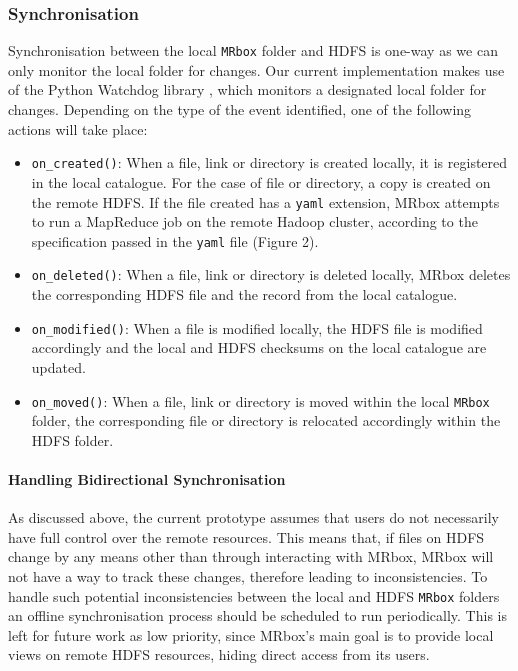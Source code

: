 \subsubsection{Synchronisation}
Synchronisation between the local \texttt{MRbox} folder and HDFS is one-way as we can only monitor the local folder for changes. Our current implementation makes use of the Python Watchdog library \cite{watchdog}, which monitors a designated local folder for changes. Depending on the type of the event identified, one of the following actions will take place: 
\begin{itemize}
    \item \texttt{on\_created()}: When a file, link or directory is created locally, it is registered in the local catalogue. For the case of file or directory, a copy is created on the remote HDFS. If the file created has a \texttt{yaml} extension, MRbox attempts to run a MapReduce job on the remote Hadoop cluster, according to the specification passed in the \texttt{yaml} file (Figure 2). 
    \item \texttt{on\_deleted()}: When a file, link or directory is deleted locally, MRbox deletes the corresponding HDFS file and the record from the local catalogue.
    \item \texttt{on\_modified()}: When a file is modified locally, the HDFS file is modified accordingly and the local and HDFS checksums on the local catalogue are updated.
    \item \texttt{on\_moved()}: When a file, link or directory is moved within the local \texttt{MRbox} folder, the corresponding file or directory is relocated accordingly within the HDFS folder. 
\end{itemize}

\paragraph{Handling Bidirectional Synchronisation}
As discussed above, the current prototype assumes that users do not necessarily have full control over the remote resources. This means that, if files on HDFS change by any means other than through interacting with MRbox, MRbox will not have a way to track these changes, therefore leading to inconsistencies. To handle such potential inconsistencies between the local and HDFS \texttt{MRbox} folders an offline synchronisation process should be scheduled to run periodically. This is left for future work as low priority, since MRbox's main goal is to provide local views on remote HDFS resources, hiding direct access from its users.

